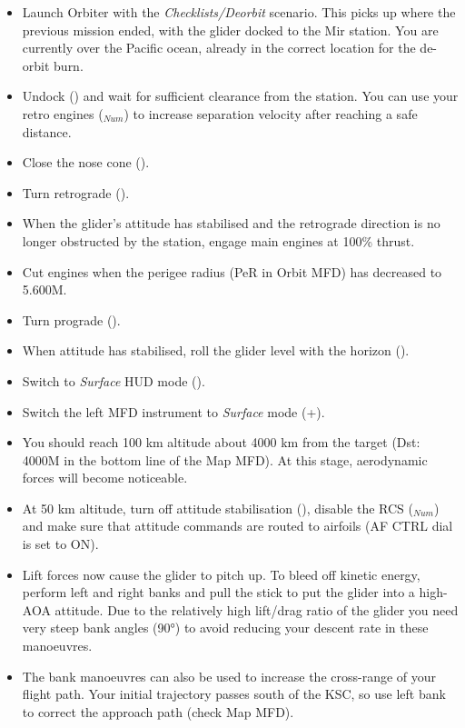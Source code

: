 \documentclass[Orbiter User Manual.tex]{subfiles}
\begin{document}
\begin{itemize}
\item Launch Orbiter with the \textit{Checklists/Deorbit} scenario. This picks up where the previous mission ended, with the glider docked to the Mir station. You are currently over the Pacific ocean, already in the correct location for the de-orbit burn.
\item Undock (\Ctrl{}) and wait for sufficient clearance from the station. You can use your retro engines (\keystroke{-}$_{Num}$) to increase separation velocity after reaching a safe distance.
\item Close the nose cone ().
\item Turn retrograde (\keystroke{]}).
\item When the glider’s attitude has stabilised and the retrograde direction is no longer obstructed by the station, engage main engines at 100\% thrust.
\item Cut engines when the perigee radius (PeR in Orbit MFD) has decreased to 5.600M.
\item Turn prograde (\keystroke{[}).
\item When attitude has stabilised, roll the glider level with the horizon ().
\item Switch to \textit{Surface} HUD mode ().
\item Switch the left MFD instrument to \textit{Surface} mode (\Shift{}+\Shift{}).
\item You should reach 100 km altitude about 4000 km from the target (Dst: 4000M in the bottom line of the Map MFD). At this stage, aerodynamic forces will become noticeable.
\item At 50 km altitude, turn off attitude stabilisation (), disable the RCS (\keystroke{/}$_{Num}$) and make sure that attitude commands are routed to airfoils (AF CTRL dial is set to ON).
\item Lift forces now cause the glider to pitch up. To bleed off kinetic energy, perform left and right banks and pull the stick to put the glider into a high-AOA attitude. Due to the relatively high lift/drag ratio of the glider you need very steep bank angles (90°) to avoid reducing your descent rate in these manoeuvres.
\item The bank manoeuvres can also be used to increase the cross-range of your flight path. Your initial trajectory passes south of the KSC, so use left bank to correct the approach path (check Map MFD).

\end{itemize}
\end{document}
